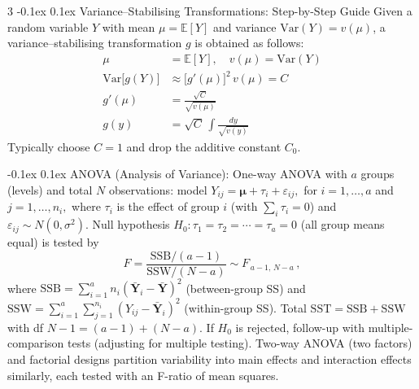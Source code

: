 \documentclass[10pt]{article}
\makeatletter
\renewcommand{\section}{\@startsection{section}{1}{0mm}
  {-0.1ex}%
  {0.1ex}%
  {\normalfont\normalsize\bfseries\color{thm-color}}}
\newcommand{\vect}[1]{\symbf{#1}} %
\makeatother
\begin{document}
\begin{multicols}{3}
  \section{Variance--Stabilising Transformations: Step-by-Step Guide}
  Given a random variable $Y$ with mean $\mu=\mathbb{E}[Y]$ and variance $\mathrm{Var}(Y)=v(\mu)$, a variance–stabilising transformation $g$ is obtained as follows:
  \begin{align}
    \mu                          & = \mathbb{E}[Y], \quad v(\mu) = \mathrm{Var}(Y) \\
    \mathrm{Var}\bigl[g(Y)\bigr] & \approx \bigl[g'(\mu)\bigr]^2 \,v(\mu) = C      \\
    g'(\mu)                      & = \frac{\sqrt{C}}{\sqrt{v(\mu)}}                \\
    g(y)                         & = \sqrt{C}\,\int \frac{dy}{\sqrt{v(y)}}
  \end{align}
  Typically choose $C=1$ and drop the additive constant $C_0$.

  \section{ANOVA (Analysis of Variance):}
  One-way ANOVA with \( a \) groups (levels) and total \( N \) observations: model \( Y_{ij} = \vect{\mu} + \tau_i + \varepsilon_{ij}, \) for \( i=1,\dots,a \) and \( j=1,\dots,n_i, \) where \( \tau_i \) is the effect of group \( i \) (with \( \sum_i \tau_i=0 \)) and \( \varepsilon_{ij}\sim N(0,\sigma^2). \)
  Null hypothesis \( H_0: \tau_1=\tau_2=\cdots=\tau_a=0 \) (all group means equal) is tested by
  \[ F = \frac{\mathrm{SSB}/(a-1)}{\mathrm{SSW}/(N-a)} \sim F_{\,a-1,\,N-a}\,, \]
  where \( \mathrm{SSB}=\sum_{i=1}^a n_i (\bar{\vect{Y}}_i - \bar{\vect{Y}})^2 \) (between-group SS) and \( \mathrm{SSW}=\sum_{i=1}^a\sum_{j=1}^{n_i}(Y_{ij}-\bar{\vect{Y}}_i)^2 \) (within-group SS).
  Total \( \mathrm{SST}=\mathrm{SSB}+\mathrm{SSW} \) with df \( N-1=(a-1)+(N-a). \)
  If \( H_0 \) is rejected, follow-up with multiple-comparison tests (adjusting for multiple testing).
  Two-way ANOVA (two factors) and factorial designs partition variability into main effects and interaction effects similarly, each tested with an F-ratio of mean squares.


\end{multicols}
\end{document}
